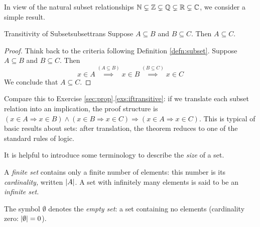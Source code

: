 \goodbreak

In view of the natural subset relationships $\mathbb{N}\subsetneq\mathbb{Z}\subsetneq\mathbb{Q}\subsetneq\mathbb{R}\subsetneq\mathbb{C}$, we consider a simple result.

\begin{lemm}{Transitivity of Subset}{subsettrans}
	Suppose $A\subseteq B$ and $B\subseteq C$. Then $A\subseteq C$.
\end{lemm}

\begin{proof}
	Think back to the criteria following Definition \ref{defn:subset}. Suppose $A\subseteq B$ and $B\subseteq C$. Then
	\[
		x\in A \overset{(A\subseteq B)}{\implies} x\in B\overset{(B\subseteq C)}{\implies} x\in C
	\]
	We conclude that $A\subseteq C$.
\end{proof}

Compare this to Exercise \ref*{sec:prop}.\ref{exs:iftransitive}: if we translate each subset relation into an implication, the proof structure is $(x\in A\Rightarrow x\in B)\wedge (x\in B\Rightarrow x\in C)\Longrightarrow (x\in A\Rightarrow x\in C)$. This is typical of basic results about sets: after translation, the theorem reduces to one of the standard rules of logic.




It is helpful to introduce some terminology to describe the \emph{size} of a set.

\begin{defn}{}{}
	A \emph{finite set} contains only a finite number of elements: this number is its \emph{cardinality,} written $\left| A\right|$. A set with infinitely many elements is said to be an \emph{infinite set.}\par
	The symbol $\emptyset$ denotes the \emph{empty set}: a set containing no elements (cardinality zero: $\left| \emptyset\right|=0$).
\end{defn}



